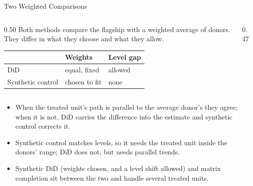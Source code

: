 \documentclass[aspectratio=169, 11pt, handout]{beamer}
\begin{document}
\begin{frame}{Two Weighted Comparisons}

\begin{columns}[c]
\begin{column}{0.50\textwidth}
Both methods compare the flagship with a weighted average of donors. They differ in what they choose and what they allow.

\medskip

\small
\begin{tabular}{@{}lll@{}}
\toprule
& \textbf{Weights} & \textbf{Level gap} \\
\midrule
DiD & equal, fixed & allowed \\
Synthetic control & chosen to fit & none \\
\bottomrule
\end{tabular}
\end{column}
\begin{column}{0.47\textwidth}
\centering
{}
\end{column}
\end{columns}

\medskip

\begin{itemize}
  \item When the treated unit's path is parallel to the average donor's they agree; when it is not, DiD carries the difference into the estimate and synthetic control corrects it.
  \item Synthetic control matches levels, so it needs the treated unit inside the donors' range; DiD does not, but needs parallel trends.
  \item Synthetic DiD (weights chosen, and a level shift allowed) and matrix completion sit between the two and handle several treated units.
\end{itemize}
\end{frame}
\end{document}
